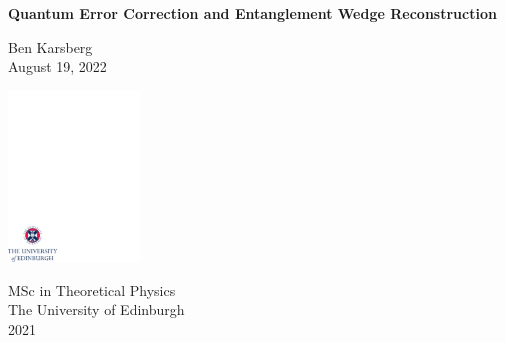\documentclass[12pt,a4paper]{report}
\numberwithin{equation}{section}
\theoremstyle{definition}
\theoremstyle{theorem}
\theoremstyle{theorem}
\theoremstyle{example}
\theoremstyle{definition}
\begin{document}
\thispagestyle{empty}

%

\parindent=0pt          %
\parskip=5pt            %


\vspace*{0.1\textheight}

\begin{center}
        \huge{\bfseries Quantum Error Correction and Entanglement Wedge Reconstruction}\\
\end{center}

\bigskip

\begin{center}
        \large{Ben Karsberg}\\  %
        \bigskip
        \large{August 19, 2022}  %
\end{center}


\vspace*{0.3\textheight}

\begin{center}
        \includegraphics[width=35mm]{crest.pdf}
\end{center}

\medskip

\begin{center}

\large{
  MSc in Theoretical Physics\\[0.8ex]
  The University of Edinburgh\\[0.8ex]
  2021
}

\end{center}
\end{document}
